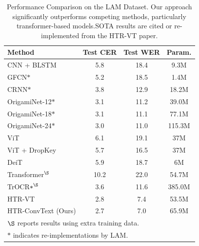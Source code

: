 \documentclass[final,5p,times]{elsarticle}
\begin{document}
\begin{table}[!t]
\centering
\caption{Performance Comparison on the LAM Dataset. Our approach significantly outperforms competing methods, particularly transformer-based models.SOTA results are cited or re-implemented from the HTR-VT paper.}
\label{tab:comparison_lam}
\begin{tabular}{l|c|c|c}
\hline
\textbf{Method} & \textbf{Test CER} & \textbf{Test WER} & \textbf{Param.} \\
\hline
CNN + BLSTM & 5.8 & 18.4 & 9.3M \\
GFCN$\ast$ & 5.2 & 18.5 & 1.4M \\
CRNN$\ast$ & 3.8 & 12.9 & 18.2M \\
OrigamiNet-12$\ast$ & 3.1 & 11.2 & 39.0M \\
OrigamiNet-18$\ast$ & 3.1 & 11.1 & 77.1M \\
OrigamiNet-24$\ast$ & 3.0 & 11.0 & 115.3M \\
ViT & 6.1 & 19.1 & 37M \\
ViT + DropKey & 5.7 & 16.5 & 37M \\
DeiT & 5.9 & 18.7 & 6M \\
Transformer$^{\S}$ & 10.2 & 22.0 & 54.7M \\
TrOCR$\ast^{\S}$ & 3.6 & 11.6 & 385.0M \\
HTR-VT & 2.8 & 7.4 & 53.5M \\
HTR-ConvText (Ours) & 2.7 & 7.0 & 65.9M \\
\hline
\multicolumn{4}{l}{\footnotesize{$\S$ reports results using extra training data.}} \\
\multicolumn{4}{l}{\footnotesize{$\ast$ indicates re-implementations by LAM.}} \\
\end{tabular}
\end{table}
\end{document}
